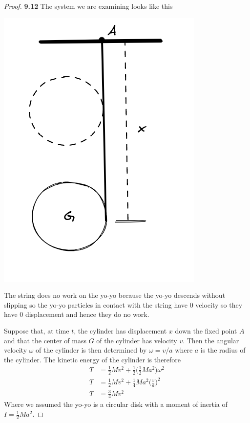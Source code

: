 \documentclass[11pt]{article}
\theoremstyle{definition}
\begin{document}
    \begin{proof}{\textbf{9.12}}
        The system we are examining looks like this
        \begin{center}
            \includegraphics[scale=0.4]{ch9-12.png}
        \end{center}
        The string does no work on the yo-yo because the yo-yo descends without
        slipping so the yo-yo particles in contact with the string have 0
        velocity so they have 0 displacement and hence they do no work.

        Suppose that, at time $t$, the cylinder has displacement $x$ down the
        fixed point $A$ and that the center of mass $G$ of the cylinder has velocity
        $v$. Then the angular velocity $\omega$ of the cylinder is then
        determined by $\omega = v/a$ where $a$ is the radius of the cylinder.
        The kinetic energy of the cylinder is therefore
        \begin{align*}
            T &= \frac{1}{2}Mv^2 +
            \frac{1}{2}\bigg(\frac{1}{2}Ma^2\bigg)\omega^2\\
            T &= \frac{1}{2}Mv^2 +
            \frac{1}{4}Ma^2\bigg(\frac{v}{a}\bigg)^2\\
            T &= \frac{3}{4}Mv^2
        \end{align*}
        Where we assumed the yo-yo is a circular disk with a moment of inertia
        of $I = \frac{1}{2}Ma^2$.


\end{proof}
\end{document}
